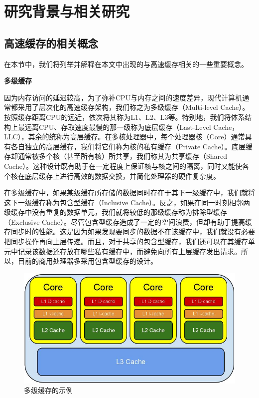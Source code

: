 
\chapter{研究背景与相关研究} \label{chap:related}
\section{高速缓存的相关概念}
在本节中，我们将列举并解释在本文中出现的与高速缓存相关的一些重要概念。

\textbf{多级缓存}

因为内存访问的延迟较高，为了弥补CPU与内存之间的速度差异，现代计算机通常都采用了层次化的高速缓存架构，我们称之为多级缓存（Multi-level Cache）。按照缓存距离CPU的远近，依次将其称为L1、L2、L3等。特别地，我们将体系结构上最远离CPU、存取速度最慢的那一级称为底层缓存（Last-Level Cache，LLC），其余的统称为高层缓存。在多核处理器中，每个处理器核（Core）通常具有各自独立的高层缓存，我们将它们称为核的私有缓存（Private Cache）。底层缓存却通常被多个核（甚至所有核）所共享，我们称其为共享缓存（Shared Cache）。这种设计既有助于在一定程度上保证核与核之间的隔离，同时又能使各个核在底层缓存上进行高效的数据交换，并简化处理器的硬件复杂度。

在多级缓存中，如果某级缓存所存储的数据同时存在于其下一级缓存中，我们就将这下一级缓存称为包含型缓存（Inclusive Cache）。反之，如果在同一时刻相邻两级缓存中没有重复的数据单元，我们就将较低的那级缓存称为排除型缓存（Exclusive Cache）。尽管包含型缓存造成了一定的空间浪费，但却有助于提高缓存同步时的性能。这是因为如果发现要同步的数据不在该缓存中，我们就没有必要把同步操作再向上层传递。而且，对于共享的包含型缓存，我们还可以在其缓存单元中记录该数据还存放在哪些私有缓存中，而避免向所有上层缓存发出请求。所以，目前的商用处理器多采用包含型缓存的设计。

\begin{figure}[htbp] 
    \centering
    \includegraphics[width=0.7\linewidth]{figures/CacheHierarchy.jpg}
    \caption{多级缓存的示例}
    \label{fig:cache_hierarchy}
\end{figure}

